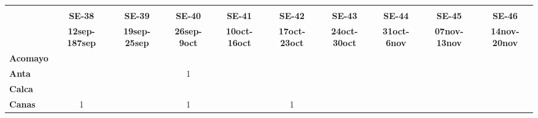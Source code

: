 \begin{tabular}{lccccccccc}
	\textbf{}              & \multicolumn{1}{l}{}                        & \multicolumn{1}{l}{}      & \multicolumn{1}{l}{}                         & \multicolumn{1}{l}{}                         & \multicolumn{1}{l}{}                         & \multicolumn{1}{l}{}                        & \multicolumn{1}{l}{}                         & \multicolumn{1}{l}{}                         & \multicolumn{1}{l}{}     \\
	\textbf{}                                                               
	&\textbf{SE-38}                              &\textbf{SE-39}                   &\textbf{SE-40}                   
	&\textbf{SE-41}                              &\textbf{SE-42}                   &\textbf{SE-43}                  
	&\textbf{SE-44} 
	&\textbf{SE-45} 							&\textbf{SE-46} \\
	\textbf{}             &\textbf{12sep-187sep}&\textbf{19sep-25sep} 		   	   &\textbf{26sep-9oct} 
	&\textbf{10oct-16oct} &\textbf{17oct-23oct} &\textbf{24oct-30oct} 		       &\textbf{31oct-6nov}  			
	&\textbf{07nov-13nov} &\textbf{14nov-20nov}\\
	\textbf{Acomayo}                        	
	&\cellcolor[HTML]{FCC46C}         			&\cellcolor[HTML]{FCC46C}          &\cellcolor[HTML]{FCC46C}     	    &\cellcolor[HTML]{FCC46C}                   &\cellcolor[HTML]{FCC46C}          &\cellcolor[HTML]{FCC46C}                  
	&\cellcolor[HTML]{FCC46C}  			        &\cellcolor[HTML]{FCC46C}          &\cellcolor[HTML]{FCC46C} \\
	\textbf{Anta}                                                                    
	& \cellcolor[HTML]{FCC46C}                  &\cellcolor[HTML]{FCC46C}         &1                   					
	& \cellcolor[HTML]{FCC46C}                  &\cellcolor[HTML]{FCC46C}         &\cellcolor[HTML]{FCC46C} 			    
	& \cellcolor[HTML]{FCC46C} 				    &\cellcolor[HTML]{FCC46C}		  &\cellcolor[HTML]{FCC46C}\\
	\textbf{Calca}      				       
	&\cellcolor[HTML]{FCC46C}         			&\cellcolor[HTML]{FCC46C}         &\cellcolor[HTML]{FCC46C}       
	&\cellcolor[HTML]{FCC46C}                   &\cellcolor[HTML]{FCC46C}         &\cellcolor[HTML]{FCC46C}                
	&\cellcolor[HTML]{FCC46C}                   &\cellcolor[HTML]{FCC46C}  		  &\cellcolor[HTML]{FCC46C} \\                										
	\textbf{Canas}                              
	&1       									&\cellcolor[HTML]{FCC46C}         &1                   &\cellcolor[HTML]{FCC46C}                   &1        			              &\cellcolor[HTML]{FCC46C}                   &\cellcolor[HTML]{FCC46C} 					&\cellcolor[HTML]{FCC46C}         			&\cellcolor[HTML]{FCC46C} \\

\end{tabular}
